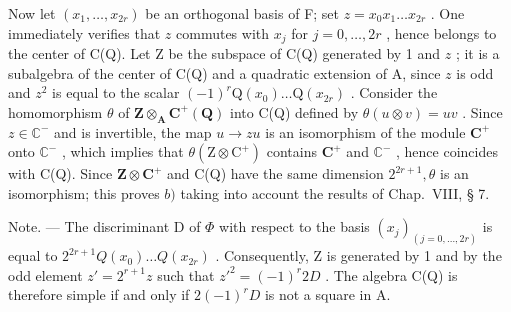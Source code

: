 Now let \((x_{1},\ldots ,x_{2r})\) be an orthogonal basis of F; set \(z = x_0x_1\dots x_{2r}\) . One immediately verifies that \(z\) commutes with \(x_{j}\) for \(j = 0,\dots,2r\) , hence belongs to the center of C(Q). Let Z be the subspace of C(Q) generated by 1 and \(z\) ; it is a subalgebra of the center of C(Q) and a quadratic extension of A, since \(z\) is odd and \(z^2\) is equal to the scalar \((-1)^r\mathrm{Q}(x_0)\ldots \mathrm{Q}(x_{2r})\) . Consider the homomorphism \(\theta\) of \(\mathbf{Z}\otimes_{\mathbf{A}}\mathbf{C}^{+}(\mathbf{Q})\) into C(Q) defined by \(\theta (u\otimes v) = uv\) . Since \(z\in \mathbb{C}^{-}\) and is invertible, the map \(u\to zu\) is an isomorphism of the module \(\mathbf{C}^+\) onto \(\mathbb{C}^{-}\) , which implies that \(\theta (\mathrm{Z}\otimes \mathrm{C}^{+})\) contains \(\mathbf{C}^{+}\) and \(\mathbb{C}^{-}\) , hence coincides with C(Q). Since \(\mathbf{Z}\otimes \mathbf{C}^{+}\) and C(Q) have the same dimension \(2^{2r + 1},\theta\) is an isomorphism; this proves \(b)\) taking into account the results of Chap.~VIII, § 7.

Note. --- The discriminant D of \(\Phi\) with respect to the basis \((x_{j})_{(j=0,\ldots,2r)}\) is equal to \(2^{2r+1}Q(x_{0})\ldots Q(x_{2r})\) . Consequently, Z is generated by 1 and by the odd element \(z' = 2^{r+1}z\) such that \(z'^{2} = (-1)^{r}2D\) . The algebra C(Q) is therefore simple if and only if \(2(-1)^{r}D\) is not a square in A.
\relax{}
